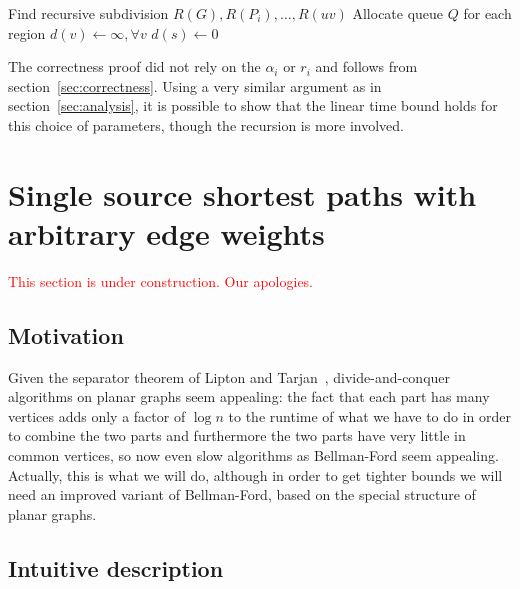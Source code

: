 \documentclass[11pt]{article}
\begin{document}
\begin{algorithm}
  \begin{algorithmic}[1]
    \State Find recursive subdivision $R(G), R(P_i), \ldots, R(uv)$
    \State Allocate queue $Q$ for each region
    \State $d(v) \gets \infty, \forall v$
    \State $d(s) \gets 0$
      \State {}
    \EndFor
      \State {}
    \EndWhile
  \end{algorithmic}
\end{algorithm}


The correctness proof did not rely on the $\alpha_i$ or $r_i$ and follows from section~\ref{sec:correctness}. Using a very similar argument as in section~\ref{sec:analysis}, it is possible to show that the linear time bound holds for this choice of parameters, though the recursion is more involved.

\section{Single source shortest paths with arbitrary edge weights}
\label{sec:arbitr-edge-weights}

\textcolor{red}{This section is under construction. Our apologies.}

\subsection{Motivation}
\label{sec:arbitr-motiv}

Given the separator theorem of Lipton and Tarjan~\cite{lipton1979separator}, divide-and-conquer algorithms on planar graphs seem appealing: the fact that each part has many vertices adds only a factor of $\log n$ to the runtime of what we have to do in order to combine the two parts and furthermore the two parts have very little in common vertices, so now even slow algorithms as Bellman-Ford seem appealing. Actually, this is what we will do, although in order to get tighter bounds we will need an improved variant of Bellman-Ford, based on the special structure of planar graphs.

\subsection{Intuitive description}
\label{sec:intu-descr}
\end{document}
